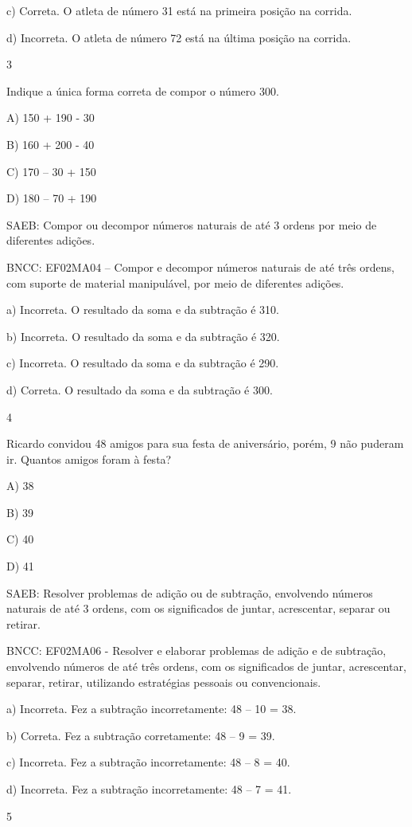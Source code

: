\begin{escolha}
\begin{escolha}
{{{{{{{{c) Correta. O atleta de número 31 está na primeira posição na
corrida.

d) Incorreta. O atleta de número 72 está na última posição na corrida.

\num{3}

Indique a única forma correta de compor o número 300.

A) 150 + 190 - 30

B) 160 + 200 - 40

C) 170 -- 30 + 150

D) 180 -- 70 + 190

SAEB: Compor ou decompor números naturais de até 3 ordens por
meio de diferentes adições.

BNCC: EF02MA04 -- Compor e decompor números naturais de até três ordens,
com suporte de material manipulável, por meio de diferentes adições.

a) Incorreta. O resultado da soma e da subtração é 310.

b) Incorreta. O resultado da soma e da subtração é 320.

c) Incorreta. O resultado da soma e da subtração é 290.

d) Correta. O resultado da soma e da subtração é 300.

\num{4}

Ricardo convidou 48 amigos para sua festa de aniversário, porém, 9 não
puderam ir. Quantos amigos foram à festa?

A) 38

B) 39

C) 40

D) 41

SAEB: Resolver problemas de adição ou de subtração, envolvendo
números naturais de até 3 ordens, com os significados de juntar,
acrescentar, separar ou retirar.

BNCC: EF02MA06 - Resolver e elaborar problemas de adição e de subtração,
envolvendo números de até três ordens, com os significados de juntar,
acrescentar, separar, retirar, utilizando estratégias pessoais ou
convencionais.

a) Incorreta. Fez a subtração incorretamente: 48 -- 10 = 38.

b) Correta. Fez a subtração corretamente: 48 -- 9 = 39.

c) Incorreta. Fez a subtração incorretamente: 48 -- 8 = 40.

d) Incorreta. Fez a subtração incorretamente: 48 -- 7 = 41.

\num{5}

}}}}}}}}
\end{escolha}
\end{escolha}
